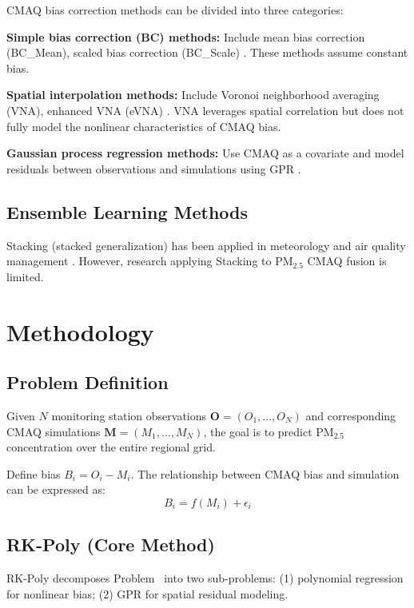 CMAQ bias correction methods can be divided into three categories:

\textbf{Simple bias correction (BC) methods:} Include mean bias correction (BC\_Mean), scaled bias correction (BC\_Scale) \citep{ram2014bias}. These methods assume constant bias.

\textbf{Spatial interpolation methods:} Include Voronoi neighborhood averaging (VNA), enhanced VNA (eVNA) \citep{singh2019enhanced}. VNA leverages spatial correlation but does not fully model the nonlinear characteristics of CMAQ bias.

\textbf{Gaussian process regression methods:} Use CMAQ as a covariate and model residuals between observations and simulations using GPR \citep{pberrocal2010dif}.

\subsection{Ensemble Learning Methods}

Stacking (stacked generalization) has been applied in meteorology and air quality management \citep{gagne2017machine}. However, research applying Stacking to PM$_{2.5}$ CMAQ fusion is limited.

\section{Methodology}
\label{sec:method}

\subsection{Problem Definition}

Given $N$ monitoring station observations $\mathbf{O} = (O_1, ..., O_N)$ and corresponding CMAQ simulations $\mathbf{M} = (M_1, ..., M_N)$, the goal is to predict PM$_{2.5}$ concentration over the entire regional grid.

Define bias $B_i = O_i - M_i$. The relationship between CMAQ bias and simulation can be expressed as:
\begin{equation}
    B_i = f(M_i) + \epsilon_i
    \label{eq:bias_model}
\end{equation}

\subsection{RK-Poly (Core Method)}

RK-Poly decomposes Problem~ into two sub-problems: (1) polynomial regression for nonlinear bias; (2) GPR for spatial residual modeling.

